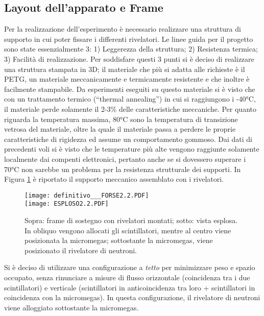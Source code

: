 \subsection{Layout dell'apparato e Frame}

Per la realizzazione dell’esperimento è necessario realizzare una struttura di supporto in cui poter fissare i differenti rivelatori. Le linee guida per il progetto sono state essenzialmente 3: 1) Leggerezza della struttura; 2) Resistenza termica; 3) Facilità di realizzazione. Per soddisfare questi 3 punti si è deciso di realizzare una struttura stampata in 3D; il materiale che più si adatta alle richieste è il PETG, un materiale meccanicamente e termicamente resistente e che inoltre è facilmente stampabile. 
Da esperimenti eseguiti su questo materiale si è visto che con un trattamento termico (“thermal annealing”) in cui si raggiungono i -40°C, il materiale perde solamente il 2-3\% delle caratteristiche meccaniche. Per quanto riguarda la temperatura massima, 80°C sono la temperatura di transizione vetrosa del materiale, oltre la quale il materiale passa a perdere le proprie caratteristiche di rigidezza ed assume un comportamento gommoso. Dai dati di precedenti voli si è visto che le temperature più alte vengono raggiunte solamente localmente dai compenti elettronici, pertanto anche se si dovessero superare i 70°C non sarebbe un problema per la resistenza strutturale dei supporti. 
In Figura \ref{frame} è riportato il supporto meccanico assemblato con i rivelatori.
\begin{figure}
    \centering
    \texttt{[image: definitivo\_\_\_FORSE2.2.PDF]}
    \\
    \texttt{[image: ESPLOSO2.2.PDF]}

    \caption{Sopra: frame di sostegno con rivelatori montati; sotto: vista esplosa. In obliquo vengono allocati gli scintillatori, mentre al centro viene posizionata la micromegas; sottostante la micromegas, viene posizionato il rivelatore di neutroni.}
    \label{frame}
\end{figure}
Si è deciso di utilizzare una configurazione a \emph{tetto} per minimizzare peso e spazio occupato, senza rinunciare a misure di flusso orizzontale (coincidenza tra i due scintillatori) e verticale (scintillatori in anticoincidenza tra loro + scintillatori in coincidenza con la micromegas).
In questa configurazione, il rivelatore di neutroni viene alloggiato sottostante la micromegas. 